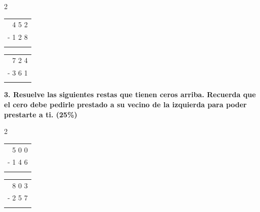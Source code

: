 \documentclass[12pt, letterpaper]{article}
\newcommand{\boxfill}[1][1.5cm]{\tcbox[on line, size=minimal, colframe=valdark!80, colback=white, boxrule=0.5pt, arc=1mm, boxsep=3pt, left=2pt, right=2pt, top=2pt, bottom=2pt]{\hspace*{#1}\vphantom{M}}}
\begin{document}
	\vspace{0.4cm}
	\begin{multicols}{2}
		\begin{center}
			\begin{tabular}{r}
				\\[0.3cm]
				4 5 2 \\
				- 1 2 8 \\
				\hline
				\boxfill[1.5cm]
			\end{tabular}
		\end{center}
		
		\begin{center}
			\begin{tabular}{r}
				\\[0.3cm]
				7 2 4 \\
				- 3 6 1 \\
				\hline
				\boxfill[1.5cm]
			\end{tabular}
		\end{center}
		
	\end{multicols}
	
	\vspace{0.6cm}
	
	\noindent \textbf{3. Resuelve las siguientes restas que tienen ceros arriba. Recuerda que el cero debe pedirle prestado a su vecino de la izquierda para poder prestarte a ti. (25\%)}
	
	\vspace{0.4cm}
	\begin{multicols}{2}
		\begin{center}
			\begin{tabular}{r}
				\\[0.3cm]
				5 0 0 \\
				- 1 4 6 \\
				\hline
				\boxfill[1.5cm]
			\end{tabular}
		\end{center}
		
		\begin{center}
			\begin{tabular}{r}
				\\[0.3cm]
				8 0 3 \\
				- 2 5 7 \\
				\hline
				\boxfill[1.5cm]
			\end{tabular}
		\end{center}

	\end{multicols}
	
\end{document}
